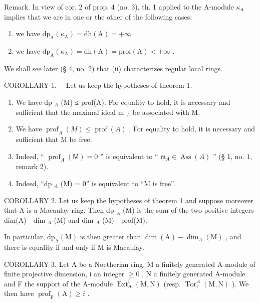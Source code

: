 Remark. In view of cor. 2 of prop. 4 (no. 3), th. 1 applied to the A-module \(\kappa_{\mathrm{A}}\) implies that we are in one or the other of the following cases:

\begin{enumerate}
\def\labelenumi{(\roman{enumi})}
\item
  we have \(\mathrm{dp}_{\mathrm{A}}(\kappa_{\mathrm{A}}) = \mathrm{dh}(\mathrm{A}) = +\infty\)
\item
  we have \(\mathrm{dp}_{\mathrm{A}}(\kappa_{\mathrm{A}}) = \mathrm{dh}(\mathrm{A}) = \mathrm{prof}(\mathrm{A}) < +\infty\) .
\end{enumerate}

We shall see later (§ 4, no. 2) that (ii) characterizes regular local rings.

COROLLARY 1.--- Let us keep the hypotheses of theorem 1.

\begin{enumerate}
\def\labelenumi{\alph{enumi})}
\item
  We have dp \(_{A}\) (M) ≤ prof(A). For equality to hold, it is necessary and sufficient that the maximal ideal m \(_{A}\) be associated with M.
\item
  We have \(\operatorname{prof}_A(M) \leqslant \operatorname{prof}(A)\) . For equality to hold, it is necessary and sufficient that M be free.
\item
  Indeed, “ \(\operatorname{prof}_{A}(\mathsf{M}) = 0\) ” is equivalent to “ \(\mathfrak{m}_A \in \operatorname{Ass}(A)\) ” (§ 1, no. 1, remark 2).
\item
  Indeed, “dp \(_{A}\) (M) = 0” is equivalent to “M is free”.
\end{enumerate}

COROLLARY 2. Let us keep the hypotheses of theorem 1 and suppose moreover that A is a Macaulay ring. Then dp \(_{A}\) (M) is the sum of the two positive integers dim(A) - dim \(_{A}\) (M) and dim \(_{A}\) (M) - prof(M).

In particular, \(\mathrm{dp}_{\mathrm{A}}(\mathrm{M})\) is then greater than \(\dim (\mathrm{A}) - \dim_{A}(\mathrm{M})\) , and there is equality if and only if M is Macaulay.

COROLLARY 3. Let A be a Noetherian ring, M a finitely generated A-module of finite projective dimension, i an integer \(\geqslant 0\) , N a finitely generated A-module and F the support of the A-module \(\operatorname{Ext}_{\mathrm{A}}^{i}(\mathrm{M},\mathrm{N})\) (resp. \(\operatorname{Tor}_{i}^{A}(\mathrm{M},\mathrm{N})\) ). We then have \(\operatorname{prof}_{\mathrm{F}}(\mathrm{A}) \geqslant i\) .

